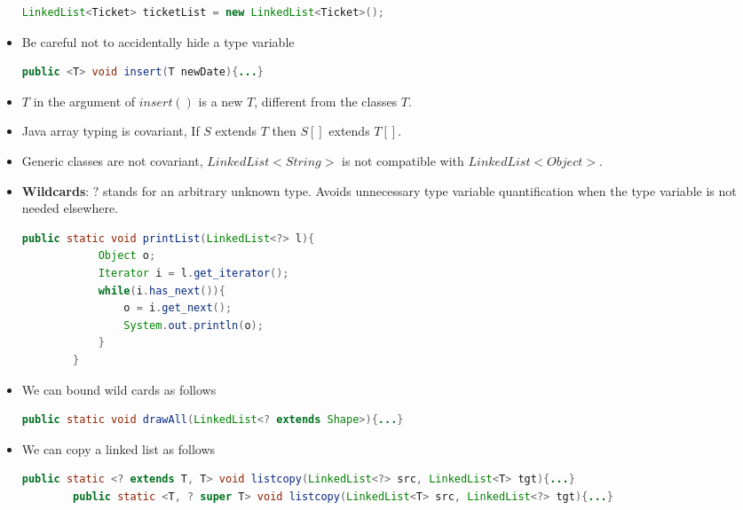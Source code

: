 \documentclass[a4paper]{article}
\begin{document}
\begin{itemize}
\begin{lstlisting}[language=Java]
        LinkedList<Ticket> ticketList = new LinkedList<Ticket>();
    \end{lstlisting}
    \item Be careful not to accidentally hide a type variable
    \begin{lstlisting}[language=Java]
        public <T> void insert(T newDate){...}
    \end{lstlisting}
    \item $T$ in the argument of $insert()$ is a new $T$, different from the classes $T$.
    \item Java array typing is covariant, If $S$ extends $T$ then $S[]$ extends $T[]$.
    \item Generic classes are not covariant, $LinkedList<String>$ is not compatible with $LinkedList<Object>$.
    \item \textbf{Wildcards}: $?$ stands for an arbitrary unknown type. Avoids unnecessary type variable quantification when the type variable is not needed elsewhere.
    \begin{lstlisting}[language=Java]
        public static void printList(LinkedList<?> l){
            Object o;
            Iterator i = l.get_iterator();
            while(i.has_next()){
                o = i.get_next();
                System.out.println(o);
            }
        }
    \end{lstlisting}
    \item We can bound wild cards as follows
    \begin{lstlisting}[language=Java]
        public static void drawAll(LinkedList<? extends Shape>){...}
    \end{lstlisting}
    \item We can copy a linked list as follows
    \begin{lstlisting}[language=Java]
        public static <? extends T, T> void listcopy(LinkedList<?> src, LinkedList<T> tgt){...}
        public static <T, ? super T> void listcopy(LinkedList<T> src, LinkedList<?> tgt){...}
    \end{lstlisting}
\end{itemize}
\end{document}
